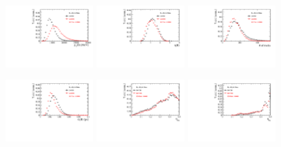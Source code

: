 \begin{figure}[h]
\centering
\includegraphics[height=!,width=0.3\textwidth]{figs/dataVsMC/trigger_norm/Ds2all_Bs_PT.pdf}
\includegraphics[height=!,width=0.3\textwidth]{figs/dataVsMC/trigger_norm/Ds2all_Bs_ETA.pdf}
\includegraphics[height=!,width=0.3\textwidth]{figs/dataVsMC/trigger_norm/Ds2all_NTracks.pdf}

\includegraphics[height=!,width=0.3\textwidth]{figs/dataVsMC/trigger_norm/Ds2all_Bs_BsDTF_TAUERR.pdf}
\includegraphics[height=!,width=0.3\textwidth]{figs/dataVsMC/trigger_norm/Ds2all_OS_Combination_PROB.pdf}
\includegraphics[height=!,width=0.3\textwidth]{figs/dataVsMC/trigger_norm/Ds2all_SS_Kaon_PROB.pdf}


\end{figure}
